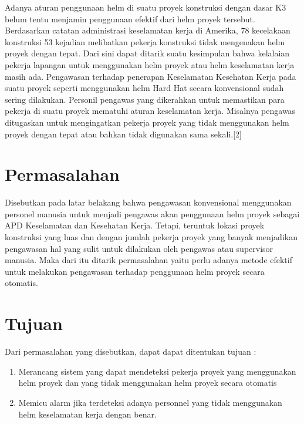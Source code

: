 Adanya aturan penggunaan helm di suatu proyek konstruksi dengan dasar K3 belum tentu menjamin penggunaan efektif dari helm proyek tersebut. Berdasarkan catatan administrasi keselamatan kerja di Amerika, 78 kecelakaan konstruksi 53 kejadian melibatkan pekerja konstruksi tidak mengenakan helm proyek dengan tepat. Dari sini dapat ditarik suatu kesimpulan bahwa kelalaian pekerja lapangan untuk menggunakan helm proyek atau helm keselamatan kerja masih ada.
Pengawasan terhadap penerapan Keselamatan Kesehatan Kerja pada suatu proyek seperti menggunakan helm Hard Hat secara konvensional sudah sering dilakukan. Personil pengawas yang dikerahkan untuk memastikan para pekerja di suatu proyek mematuhi aturan keselamatan kerja. Misalnya pengawas ditugaskan untuk mengingatkan pekerja proyek yang tidak menggunakan helm proyek dengan tepat atau bahkan tidak digunakan sama sekali.[2]

\section{Permasalahan}
\label{sec:permasalahan}

Disebutkan pada latar belakang bahwa pengawasan konvensional menggunakan personel manusia untuk menjadi pengawas akan penggunaan helm proyek sebagai APD Keselamatan dan Kesehatan Kerja. Tetapi, teruntuk lokasi proyek konstruksi yang luas dan dengan jumlah pekerja proyek yang banyak menjadikan pengawasan hal yang sulit untuk dilakukan oleh pengawas atau supervisor manusia. Maka dari itu ditarik permasalahan yaitu perlu adanya metode efektif untuk melakukan pengawasan terhadap penggunaan helm proyek secara otomatis. 

\section{Tujuan}
\label{sec:Tujuan}

Dari permasalahan yang disebutkan, dapat dapat ditentukan tujuan :

\begin{enumerate}[nolistsep]

  \item Merancang sistem yang dapat mendeteksi pekerja proyek yang menggunakan helm proyek dan yang tidak menggunakan helm proyek secara otomatis
  \item Memicu alarm jika terdeteksi adanya personnel yang tidak menggunakan helm keselamatan kerja dengan benar.

\end{enumerate}

